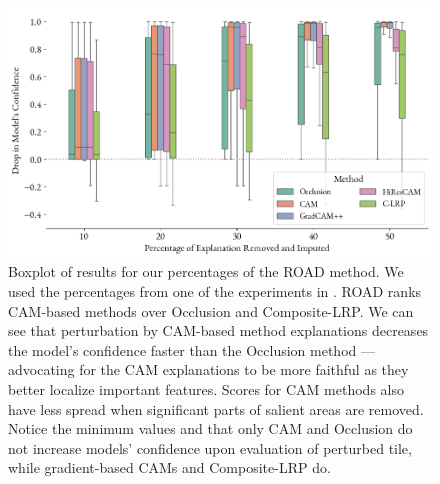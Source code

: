 \begin{figure}
    \begin{center}
    \begin{minipage}{1\textwidth}
      \includegraphics[width=\textwidth]{img/road-boxplot.png}
    \end{minipage}
    \caption{
    Boxplot of results for our percentages of the ROAD method.
    We used the percentages from one of the experiments in \cite{road}.
    ROAD ranks CAM-based methods over Occlusion and Composite-LRP.
    We can see that perturbation by CAM-based method explanations decreases the model's confidence faster than the Occlusion method --- advocating for the CAM explanations to be more faithful as they better localize important features.
    Scores for CAM methods also have less spread when significant parts of salient areas are removed.
    Notice the minimum values and that only CAM and Occlusion do not increase models' confidence upon evaluation of perturbed tile, while gradient-based CAMs and Composite-LRP do.
    }
    \label{fig:road-boxplot}
    \end{center}
\end{figure}

